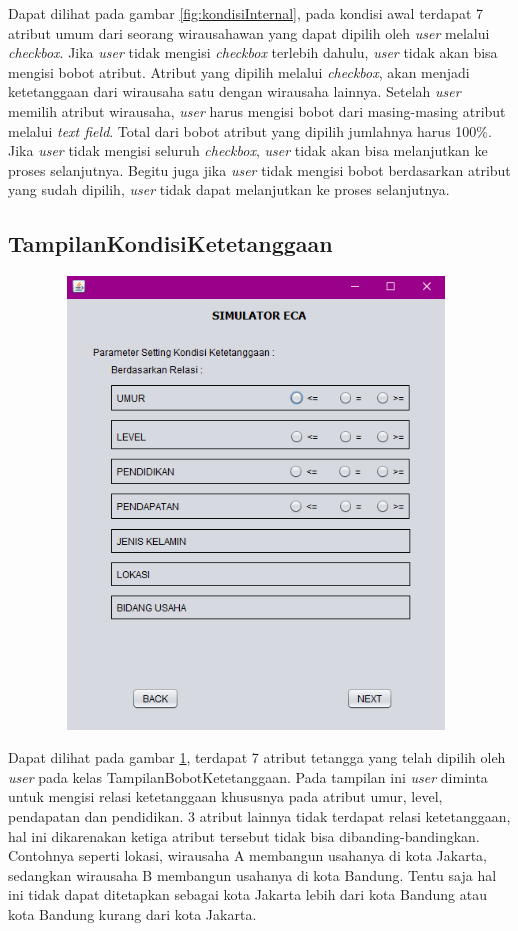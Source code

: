 Dapat dilihat pada gambar \ref{fig:kondisiInternal}, pada kondisi awal terdapat 7 atribut umum dari seorang wirausahawan yang dapat dipilih oleh \textit{user} melalui \textit{checkbox}. Jika \textit{user} tidak mengisi \textit{checkbox} terlebih dahulu, \textit{user} tidak akan bisa mengisi bobot atribut. Atribut yang dipilih melalui \textit{checkbox}, akan menjadi ketetanggaan dari wirausaha satu dengan wirausaha lainnya. Setelah \textit{user} memilih atribut wirausaha, \textit{user} harus mengisi bobot dari masing-masing atribut melalui \textit{text field}. Total dari bobot atribut yang dipilih jumlahnya harus 100\%. Jika \textit{user} tidak mengisi seluruh  \textit{checkbox}, \textit{user} tidak akan bisa melanjutkan ke proses selanjutnya. Begitu juga jika \textit{user} tidak mengisi bobot berdasarkan atribut yang sudah dipilih, \textit{user} tidak dapat melanjutkan ke proses selanjutnya.

\subsection{TampilanKondisiKetetanggaan}

\begin{figure} [H]
	\centering  
	\includegraphics[width=11cm, height=12cm]{tampilanKondisiKetetanggaan} 
	\label{fig:kondisiTetangga} 
\end{figure}

Dapat dilihat pada gambar \ref{fig:kondisiTetangga}, terdapat 7 atribut tetangga yang telah dipilih oleh \textit{user} pada kelas TampilanBobotKetetanggaan. Pada tampilan ini \textit{user} diminta untuk mengisi relasi ketetanggaan khususnya pada atribut umur, level, pendapatan dan pendidikan. 3 atribut lainnya tidak terdapat relasi ketetanggaan, hal ini dikarenakan ketiga atribut tersebut tidak bisa dibanding-bandingkan. Contohnya seperti lokasi, wirausaha A membangun usahanya di kota Jakarta, sedangkan wirausaha B membangun usahanya di kota Bandung. Tentu saja hal ini tidak dapat ditetapkan sebagai kota Jakarta lebih dari kota Bandung atau kota Bandung kurang dari kota Jakarta.

